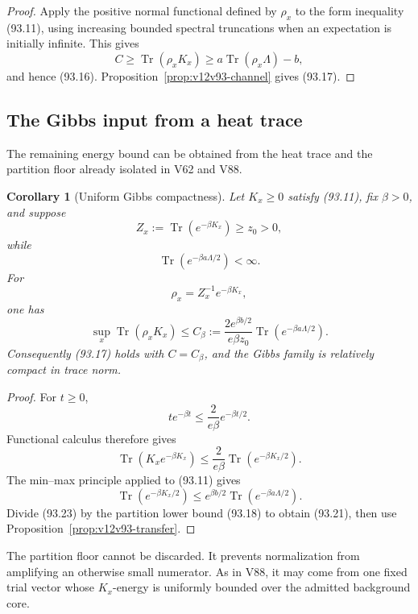 \documentclass[11pt]{article}
\newtheorem{corollary}[theorem]{Corollary}
\theoremstyle{remark}
\begin{document}
\begin{proof}
Apply the positive normal functional defined by \(\rho_x\) to the
form inequality (93.11), using increasing bounded spectral
truncations when an expectation is initially infinite.  This gives
\[
 C\geq\operatorname{Tr}(\rho_xK_x)
 \geq a\operatorname{Tr}(\rho_x\Lambda)-b,
\]
and hence (93.16).  Proposition~\ref{prop:v12v93-channel} gives
(93.17).
\end{proof}

\subsection{The Gibbs input from a heat trace}

The remaining energy bound can be obtained from the heat trace and
the partition floor already isolated in V62 and V88.

\begin{corollary}[Uniform Gibbs compactness]
\label{cor:v12v93-gibbs}
Let \(K_x\geq0\) satisfy (93.11), fix \(\beta>0\), and suppose
\[
 Z_x:=\operatorname{Tr}(e^{-\beta K_x})\geq z_0>0,               \tag{93.18}
\]
while
\[
 \operatorname{Tr}(e^{-\beta a\Lambda/2})<\infty.                \tag{93.19}
\]
For
\[
 \rho_x=Z_x^{-1}e^{-\beta K_x},                                  \tag{93.20}
\]
one has
\[
 \sup_x\operatorname{Tr}(\rho_xK_x)
 \leq
 C_\beta:=
 \frac{2e^{\beta b/2}}{e\beta z_0}
 \operatorname{Tr}(e^{-\beta a\Lambda/2}).                       \tag{93.21}
\]
Consequently (93.17) holds with \(C=C_\beta\), and the Gibbs family
is relatively compact in trace norm.
\end{corollary}

\begin{proof}
For \(t\geq0\),
\[
 te^{-\beta t}\leq\frac{2}{e\beta}e^{-\beta t/2}.                 \tag{93.22}
\]
Functional calculus therefore gives
\[
 \operatorname{Tr}(K_xe^{-\beta K_x})
 \leq\frac{2}{e\beta}
       \operatorname{Tr}(e^{-\beta K_x/2}).                      \tag{93.23}
\]
The min--max principle applied to (93.11) gives
\[
 \operatorname{Tr}(e^{-\beta K_x/2})
 \leq e^{\beta b/2}
       \operatorname{Tr}(e^{-\beta a\Lambda/2}).                 \tag{93.24}
\]
Divide (93.23) by the partition lower bound (93.18) to obtain
(93.21), then use
Proposition~\ref{prop:v12v93-transfer}.
\end{proof}

The partition floor cannot be discarded.  It prevents normalization
from amplifying an otherwise small numerator.  As in V88, it may
come from one fixed trial vector whose \(K_x\)-energy is uniformly
bounded over the admitted background core.
\end{document}
